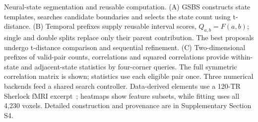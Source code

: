 Neural-state segmentation and reusable computation. (A) GSBS constructs state templates, searches candidate boundaries and selects the state count using t-distance. (B) Temporal prefixes supply reusable interval scores, $Q_{a,b}=F(a,b)$; single and double splits replace only their parent contribution. The best proposals undergo t-distance comparison and sequential refinement. (C) Two-dimensional prefixes of valid-pair counts, correlations and squared correlations provide within-state and adjacent-state statistics by four-corner queries. The full symmetric correlation matrix is shown; statistics use each eligible pair once. Three numerical backends feed a shared search controller. Data-derived elements use a 120-TR Sherlock fMRI excerpt~\cite{baldassano2020sherlock,chen2017shared}; heatmaps show feature subsets, while fitting uses all 4,230 voxels. Detailed construction and provenance are in Supplementary Section S4.
